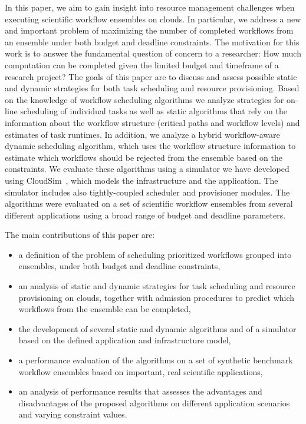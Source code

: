 \documentclass[conference]{IEEEtran}
\begin{document}
In this paper, we aim to gain insight into resource management challenges when executing 
scientific workflow ensembles on clouds. In particular, we address a new and important 
problem of maximizing the number of completed workflows from an ensemble under both budget and
deadline constraints. The motivation for this work is to answer the fundamental question of 
concern to a researcher: How much computation can be completed given the limited budget and 
timeframe of a research project? The goals of this paper are to discuss and assess possible
static and dynamic strategies for both task scheduling and resource
provisioning. Based on the knowledge of workflow scheduling algorithms we
analyze strategies for on-line scheduling of individual tasks as well as static
algorithms that rely on the information about the workflow structure (critical
paths and workflow levels) and estimates of task runtimes. In addition, we
analyze a hybrid workflow-aware dynamic scheduling algorithm, which uses the
workflow structure information to estimate which workflows should be rejected
from the ensemble based on the constraints. We evaluate these algorithms using a
simulator we have developed using CloudSim~\cite{Calheiros2011}, which models the 
infrastructure and the application. The simulator includes also tightly-coupled 
scheduler and provisioner modules. The algorithms were evaluated on a set 
of scientific workflow ensembles from several different applications using a 
broad range of budget and deadline parameters. 

The main contributions of this paper are:
\begin{itemize}
  \item a definition of the problem of scheduling prioritized workflows grouped into
  ensembles, under both budget and deadline constraints,
  \item an analysis of static and dynamic strategies for task scheduling and
  resource provisioning on clouds, together with admission procedures to
  predict which workflows from the ensemble can be completed,
  \item the development of several static and dynamic algorithms and of a simulator based
  on the defined application and infrastructure model,
  \item a performance evaluation of the algorithms on a set of synthetic benchmark
  workflow ensembles based on important, real scientific applications,
  \item an analysis of performance results that assesses the advantages and
  disadvantages of the proposed algorithms on different application scenarios and
  varying constraint values.
\end{itemize}
\end{document}
